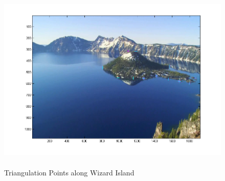 \documentclass[11pt,psfig]{article}
\begin{document}
\begin{figure}[H]
\centering
\includegraphics[height=3.5in]{sfmResults1/photoLeft_wizardIslandPoints.png}
\caption{Triangulation Points along Wizard Island}
\end{figure}
\end{document}
